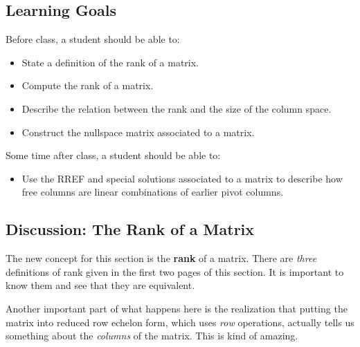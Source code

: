\documentclass[10pt,]{book}
\newcommand{\terminology}[1]{\textbf{#1}}
\theoremstyle{plain}
\theoremstyle{definition}
\numberwithin{equation}{section}
\begin{document}
\subsection[Learning Goals]{Learning Goals}\label{subsection-69}
Before class, a student should be able to:%
\begin{itemize}
\item{}State a definition of the rank of a matrix.\item{}Compute the rank of a matrix.\item{}Describe the relation between the rank and the size of the column
        space.
      \item{}Construct the nullspace matrix associated to a matrix.\end{itemize}
\par
Some time after class, a student should be able to:%
\begin{itemize}
\item{}Use the RREF and special solutions associated to a matrix to describe
        how free columns are linear combinations of earlier pivot columns.
      \end{itemize}
\typeout{************************************************}
\typeout{************************************************}
\subsection[Discussion: The Rank of a Matrix]{Discussion: The Rank of a Matrix}\label{subsection-70}

      The new concept for this section is the \terminology{rank} of a matrix.
      There are \emph{three} definitions of rank given in the first two
      pages of this section. It is important to know them and see that they
      are equivalent.
\par

      Another important part of what happens here is the realization that
      putting the matrix into reduced row echelon form, which uses \emph{row}
      operations, actually tells us something about the \emph{columns} of the
      matrix. This is kind of amazing.
\par
\end{document}
